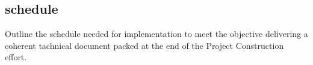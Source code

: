 \subsection{schedule}

Outline the schedule needed for implementation to meet the objective delivering a coherent tachnical document packed at the end of the Project Construction effort.